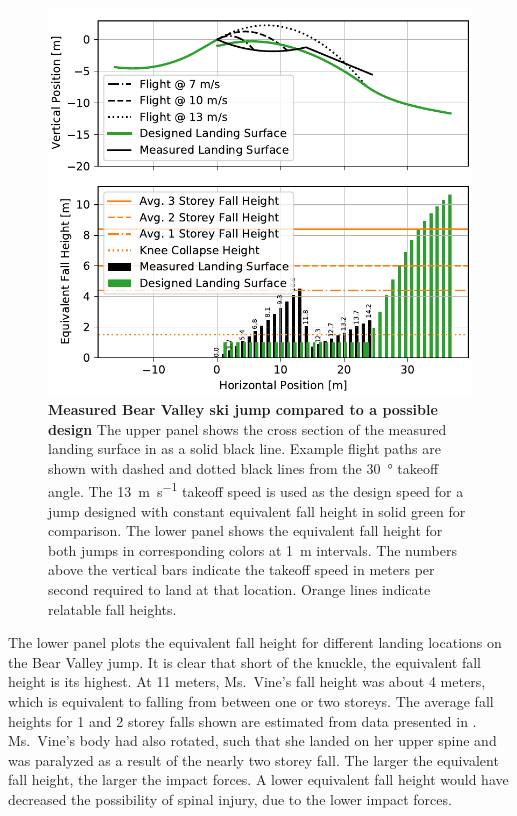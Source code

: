 \documentclass{article}
\begin{document}
\begin{figure}
  \centering
  \includegraphics[width=5.25in]{figures/vine-v-bear-valley.pdf}
  \caption{\textbf{Measured Bear Valley ski jump compared to a possible design}
  The upper panel shows the cross section of the measured landing surface in as
  a solid black line. Example flight paths are shown with dashed and dotted
  black lines from the 30~\si{\degree} takeoff angle. The
  13~\si{\meter\per\second} takeoff speed is used as the design speed for a
  jump designed with constant equivalent fall height in solid green for
  comparison. The lower panel shows the equivalent fall height for both jumps
  in corresponding colors at 1~\si{\meter} intervals. The numbers above the
  vertical bars indicate the takeoff speed in meters per second required to
  land at that location. Orange lines indicate relatable fall heights.}
  \label{fig:vine-v-bear-valley}
\end{figure}

The lower panel plots the equivalent fall height for different landing
locations on the Bear Valley jump. It is clear that short of the knuckle, the
equivalent fall height is its highest. At 11 meters, Ms.~Vine's fall height was
about 4 meters, which is equivalent to falling from between one or two storeys.
The average fall heights for 1 and 2 storey falls shown are estimated from data
presented in \cite{Vish2005}.  Ms.~Vine's body had also rotated, such that she
landed on her upper spine and was paralyzed as a result of the nearly two
storey fall. The larger the equivalent fall height, the larger the impact
forces. A lower equivalent fall height would have decreased the possibility of
spinal injury, due to the lower impact forces.
\end{document}
